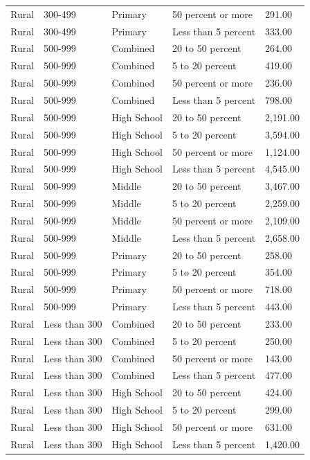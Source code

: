 \documentclass[
  man, fleqn, noextraspace]{apa6}
\begin{document}
\begin{table}[tbp]
\begin{center}
\begin{threeparttable}
\begin{tabular}{lllll}
Rural & 300-499 & Primary & 50 percent or more & 291.00\\
Rural & 300-499 & Primary & Less than 5 percent & 333.00\\
Rural & 500-999 & Combined & 20 to 50 percent & 264.00\\
Rural & 500-999 & Combined & 5 to 20 percent & 419.00\\
Rural & 500-999 & Combined & 50 percent or more & 236.00\\
Rural & 500-999 & Combined & Less than 5 percent & 798.00\\
Rural & 500-999 & High School & 20 to 50 percent & 2,191.00\\
Rural & 500-999 & High School & 5 to 20 percent & 3,594.00\\
Rural & 500-999 & High School & 50 percent or more & 1,124.00\\
Rural & 500-999 & High School & Less than 5 percent & 4,545.00\\
Rural & 500-999 & Middle & 20 to 50 percent & 3,467.00\\
Rural & 500-999 & Middle & 5 to 20 percent & 2,259.00\\
Rural & 500-999 & Middle & 50 percent or more & 2,109.00\\
Rural & 500-999 & Middle & Less than 5 percent & 2,658.00\\
Rural & 500-999 & Primary & 20 to 50 percent & 258.00\\
Rural & 500-999 & Primary & 5 to 20 percent & 354.00\\
Rural & 500-999 & Primary & 50 percent or more & 718.00\\
Rural & 500-999 & Primary & Less than 5 percent & 443.00\\
Rural & Less than 300 & Combined & 20 to 50 percent & 233.00\\
Rural & Less than 300 & Combined & 5 to 20 percent & 250.00\\
Rural & Less than 300 & Combined & 50 percent or more & 143.00\\
Rural & Less than 300 & Combined & Less than 5 percent & 477.00\\
Rural & Less than 300 & High School & 20 to 50 percent & 424.00\\
Rural & Less than 300 & High School & 5 to 20 percent & 299.00\\
Rural & Less than 300 & High School & 50 percent or more & 631.00\\
Rural & Less than 300 & High School & Less than 5 percent & 1,420.00\\

\end{tabular}
\end{threeparttable}
\end{center}
\end{table}
\end{document}
